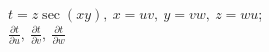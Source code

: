 \item $t = z \sec(xy), \ x = uv, \ y = vw, \ z = wu$; \\
$\frac{\partial t}{\partial u}, \ \frac{\partial t}{\partial v}, \ \frac{\partial t}{\partial w}$
